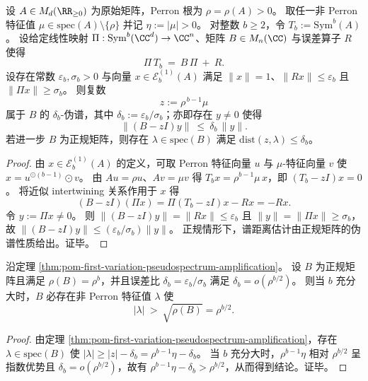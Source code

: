\begin{theorem}\label{thm:pom-first-variation-pseudospectrum-amplification}
设 \(A\in M_d(\RR_{\ge 0})\) 为原始矩阵，Perron 根为 \(\rho=\rho(A)>0\)。
取任一非 Perron 特征值 \(\mu\in\mathrm{spec}(A)\setminus\{\rho\}\) 并记 \(\eta:=|\mu|>0\)。
对整数 \(b\ge 2\)，令 \(T_b:=\mathrm{Sym}^b(A)\)。
设给定线性映射 \(\Pi:\mathrm{Sym}^b(\CC^d)\to \CC^n\)、矩阵 \(B\in M_n(\CC)\) 与误差算子 \(R\) 使得
\[
\Pi\,T_b\ =\ B\,\Pi\ +\ R.
\]
设存在常数 \(\varepsilon_b,\sigma_b>0\) 与向量 \(x\in\mathcal{E}^{(1)}_b(A)\) 满足 \(\|x\|=1\)、\(\|Rx\|\le \varepsilon_b\) 且 \(\|\Pi x\|\ge \sigma_b\)。
则复数
\[
z:=\rho^{\,b-1}\mu
\]
属于 \(B\) 的 \(\delta_b\)-伪谱，其中 \(\delta_b:=\varepsilon_b/\sigma_b\)；亦即存在 \(y\neq 0\) 使得
\[
\|(B-zI)y\|\ \le\ \delta_b\,\|y\|.
\]
若进一步 \(B\) 为正规矩阵，则存在 \(\lambda\in\mathrm{spec}(B)\) 满足 \(\mathrm{dist}(z,\lambda)\le \delta_b\)。
\end{theorem}
\begin{proof}
由 \(x\in\mathcal{E}^{(1)}_b(A)\) 的定义，可取 Perron 特征向量 \(u\) 与 \(\mu\)-特征向量 \(v\) 使 \(x=u^{\odot(b-1)}\odot v\)。
由 \(Au=\rho u\)、\(Av=\mu v\) 得 \(T_bx=\rho^{b-1}\mu\,x\)，即 \((T_b-zI)x=0\)。
将近似 intertwining 关系作用于 \(x\) 得
\[
(B-zI)(\Pi x)=\Pi(T_b-zI)x-Rx=-Rx.
\]
令 \(y:=\Pi x\neq 0\)。
则 \(\|(B-zI)y\|=\|Rx\|\le \varepsilon_b\) 且 \(\|y\|=\|\Pi x\|\ge \sigma_b\)，故
\(
\|(B-zI)y\|\le (\varepsilon_b/\sigma_b)\|y\|
\)。
正规情形下，谱距离估计由正规矩阵的伪谱性质给出。证毕。
\end{proof}

\begin{corollary}\label{cor:pom-first-variation-pseudospectrum-breaks-sqrt-bound}
沿定理 \ref{thm:pom-first-variation-pseudospectrum-amplification}。
设 \(B\) 为正规矩阵且满足 \(\rho(B)=\rho^b\)，并且误差比 \(\delta_b=\varepsilon_b/\sigma_b\) 满足 \(\delta_b=o(\rho^{b/2})\)。
则当 \(b\) 充分大时，\(B\) 必存在非 Perron 特征值 \(\lambda\) 使
\[
|\lambda|\ >\ \sqrt{\rho(B)}=\rho^{b/2}.
\]
\end{corollary}
\begin{proof}
由定理 \ref{thm:pom-first-variation-pseudospectrum-amplification}，存在 \(\lambda\in\mathrm{spec}(B)\) 使
\(
|\lambda|\ge |z|-\delta_b=\rho^{b-1}\eta-\delta_b
\)。
当 \(b\) 充分大时，\(\rho^{b-1}\eta\) 相对 \(\rho^{b/2}\) 呈指数优势且 \(\delta_b=o(\rho^{b/2})\)，故有 \(\rho^{b-1}\eta-\delta_b>\rho^{b/2}\)，从而得到结论。证毕。
\end{proof}

